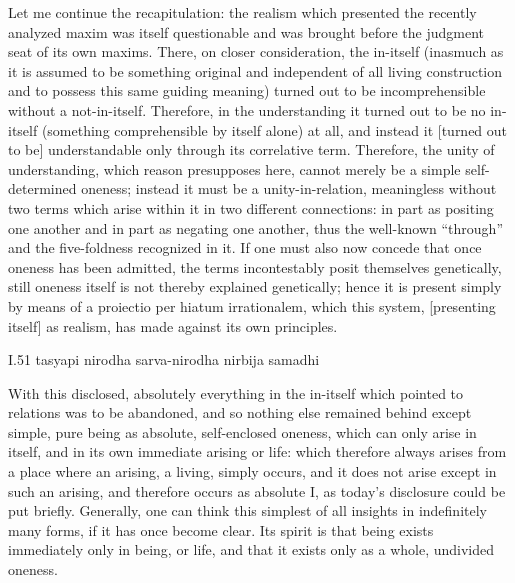 Let me continue the recapitulation:
the realism which presented
the recently analyzed maxim was
itself questionable and was brought before
the judgment seat of its own maxims.
There, on closer consideration, the in-itself
(inasmuch as it is assumed to be something original
and independent of all living construction
and to possess this same guiding meaning)
turned out to be incomprehensible
without a not-in-itself.
Therefore, in the understanding
it turned out to be no in-itself
(something comprehensible by itself alone) at all,
and instead it [turned out to be] understandable
only through its correlative term.
Therefore, the unity of understanding,
which reason presupposes here,
cannot merely be a simple self-determined oneness;
instead it must be a unity-in-relation,
meaningless without two terms
which arise within it in two different connections:
in part as positing one another
and in part as negating one another,
thus the well-known “through” and
the five-foldness recognized in it.
If one must also now concede that
once oneness has been admitted,
the terms incontestably posit themselves genetically,
still oneness itself is not thereby explained genetically;
hence it is present simply by means of
a proiectio per hiatum irrationalem,
which this system, [presenting itself] as realism,
has made against its own principles.

I.51
tasyapi nirodha sarva-nirodha nirbija samadhi

With this disclosed, absolutely everything
in the in-itself which pointed to relations
was to be abandoned,
and so nothing else remained behind
except simple, pure being
as absolute, self-enclosed oneness,
which can only arise in itself,
and in its own immediate arising or life:
which therefore always arises
from a place where an arising,
a living, simply occurs, and
it does not arise except in such an arising,
and therefore occurs as absolute I,
as today's disclosure could be put briefly.
Generally, one can think this simplest
of all insights in indefinitely many forms,
if it has once become clear.
Its spirit is that being exists
immediately only in being, or life,
and that it exists only
as a whole, undivided oneness.
